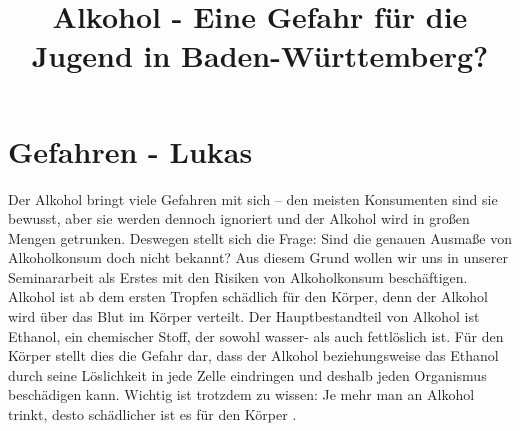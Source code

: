 \documentclass[12pt]{article}
\title{Alkohol - Eine Gefahr für die Jugend in Baden-Württemberg?}
\begin{document}
\maketitle
\tableofcontents

\section{Gefahren \footnotesize{- Lukas}} %
Der Alkohol bringt viele Gefahren mit sich – den meisten Konsumenten sind sie bewusst, aber sie werden dennoch ignoriert und der Alkohol wird in großen Mengen getrunken. 
Deswegen stellt sich die Frage: Sind die genauen Ausmaße von Alkoholkonsum doch nicht bekannt? 
Aus diesem Grund wollen wir uns in unserer Seminararbeit als Erstes mit den Risiken von Alkoholkonsum beschäftigen.%
Alkohol ist ab dem ersten Tropfen schädlich für den Körper, denn der Alkohol wird über das Blut im Körper verteilt. Der Hauptbestandteil von Alkohol ist Ethanol, ein chemischer Stoff, der sowohl wasser- als auch fettlöslich ist. Für den Körper stellt dies die Gefahr dar, dass der Alkohol beziehungsweise das Ethanol durch seine Löslichkeit in jede Zelle eindringen und deshalb jeden Organismus beschädigen kann. Wichtig ist trotzdem zu wissen: Je mehr man an Alkohol trinkt, desto schädlicher ist es für den Körper \autocite{burger_bundes-gesundheitssurvey_2003}.\\
\end{document}
